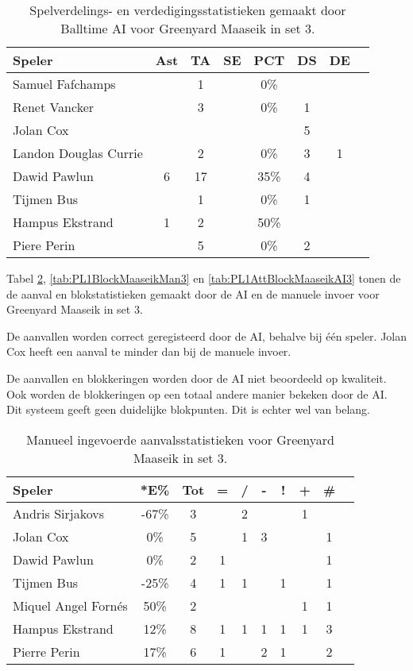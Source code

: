 \begin{table}[ht!]
  \centering
  \scriptsize
  \begin{tabular}{|l|c|c|c|c|c|c|c|} \hline
    \textbf{Speler} & Ast & TA & SE & PCT & DS & DE \\ \hline
    Samuel Fafchamps &  & 1 &  & 0\% &  &  \\
    Renet Vancker &  & 3 &  & 0\% & 1 &  \\
    Jolan Cox &  &  &  &  &  5 &  \\
    Landon Douglas Currie &  & 2 &  & 0\% & 3 & 1 \\
    Dawid Pawlun & 6 & 17 &  & 35\% & 4 &  \\
    Tijmen Bus &  & 1 &  & 0\% & 1 &  \\
    Hampus Ekstrand & 1 & 2 & & 50\% &  &  \\
    Piere Perin &  & 5 &  & 0\% & 2 &  \\  \hline
  \end{tabular}
  \caption[Spelverdelings- en verdedigingsstatistieken gemaakt door Balltime AI voor Greenyard Maaseik in set 3]{\label{tab:PL1SetDigMaaseikAI3}Spelverdelings- en verdedigingsstatistieken gemaakt door Balltime AI voor Greenyard Maaseik in set 3.}
\end{table}

Tabel \ref{tab:PL1AttMaaseikMan3}, \ref{tab:PL1BlockMaaseikMan3} en \ref{tab:PL1AttBlockMaaseikAI3} tonen de de aanval en blokstatistieken gemaakt door de AI en de manuele invoer voor Greenyard Maaseik in set 3. 

De aanvallen worden correct geregisteerd door de AI, behalve bij één speler. Jolan Cox heeft een aanval te minder dan bij de manuele invoer. 

De aanvallen en blokkeringen worden door de AI niet beoordeeld op kwaliteit. Ook worden de blokkeringen op een totaal andere manier bekeken door de AI. Dit systeem geeft geen duidelijke blokpunten. Dit is echter wel van belang.

\begin{table}[ht!]
    \centering
    \scriptsize
    \begin{tabular}{|l|c|c|c|c|c|c|c|c|c|} \hline
        \textbf{Speler} & *E\% & Tot & = & / & - & ! & + & \#\\ \hline
        Andris Sirjakovs & -67\% & 3 &  & 2 &  &  & 1 &  \\ 
        Jolan Cox & 0\% & 5 &  & 1 & 3 &  &  & 1 \\ 
        Dawid Pawlun & 0\% & 2 & 1 &  &  &  &  & 1 \\ 
        Tijmen Bus & -25\% & 4 & 1 & 1 &  & 1 &  & 1 \\ 
        Miquel Angel Fornés & 50\% & 2 &  &  &  &  & 1 & 1 \\ 
        Hampus Ekstrand & 12\% & 8 & 1 & 1 & 1 & 1 & 1 & 3 \\ 
        Pierre Perin  & 17\% & 6 & 1 &  & 2 & 1 &  & 2 \\ \hline
    \end{tabular}
   \caption[Manueel ingevoerde aanvalsstatistieken voor Greenyard Maaseik in set 3]{\label{tab:PL1AttMaaseikMan3}Manueel ingevoerde aanvalsstatistieken voor Greenyard Maaseik in set 3.}
\end{table}

